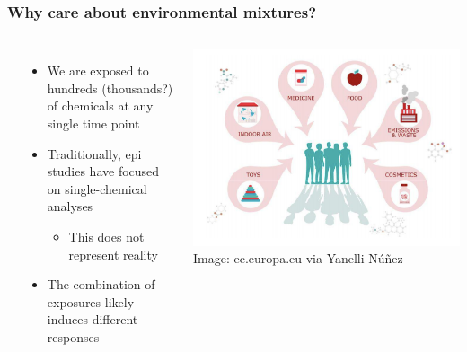 \frame
{\frametitle{ Why care about environmental mixtures? }
\begin{columns}
\vspace{2ex} \\
    \begin{itemize}
        \item We are exposed to hundreds (thousands?) of chemicals at any single time point
        \item Traditionally, epi studies have focused on single-chemical analyses
        \begin{itemize}
            \item This does not represent reality
        \end{itemize}
        \item The {\color{matbluedark} combination} of exposures likely induces different responses 
    \end{itemize}
\begin{center}
	\includegraphics[scale=0.275]{figures/europa_image.png} \\
\raggedleft
	{\tiny\color{hgray}Image: ec.europa.eu via Yanelli N\'{u}\~{n}ez}
\end{center}
\end{columns}
}

